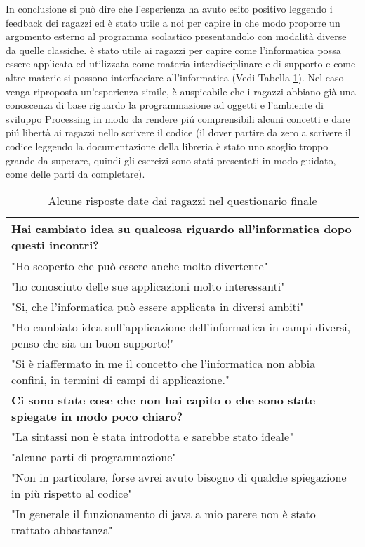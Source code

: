 In conclusione si può dire che l'esperienza ha avuto esito positivo leggendo i feedback dei ragazzi ed è stato utile a noi per capire in che modo proporre un argomento esterno al programma scolastico presentandolo con modalità diverse da quelle classiche. è stato utile ai ragazzi per capire come l'informatica possa essere applicata ed utilizzata come materia interdisciplinare e di supporto e come altre materie si possono interfacciare all'informatica (Vedi Tabella \ref{table:risposte_finali}). Nel caso venga riproposta un'esperienza simile, è auspicabile che i ragazzi abbiano già una conoscenza di base riguardo la programmazione ad oggetti e l'ambiente di sviluppo Processing in modo da rendere piú comprensibili alcuni concetti e dare piú libertà ai ragazzi nello scrivere il codice (il dover partire da zero a scrivere il codice leggendo la documentazione della libreria è stato uno scoglio troppo grande da superare, quindi gli esercizi sono stati presentati in modo guidato, come delle parti da completare).



\begin{center}
\def\arraystretch{1.3}
\begin{table}[!ht]

    \caption{Alcune risposte date dai ragazzi nel questionario finale}

    \begin{tabular}{p{}}
        
        \bfseries{Hai cambiato idea su qualcosa riguardo all'informatica dopo questi incontri?} \\
        \midrule
        "Ho scoperto che può essere anche molto divertente"  \\
        "ho conosciuto delle sue applicazioni molto interessanti" \\
        "Si, che l'informatica può essere applicata in diversi ambiti" \\
        "Ho cambiato idea sull'applicazione dell'informatica in campi diversi, penso che sia un buon supporto!" \\
        "Si è riaffermato in me il concetto che l'informatica non abbia confini, in termini di campi di applicazione." \\
        \midrule
        \bfseries{Ci sono state cose che non hai capito o che sono state spiegate in modo poco chiaro?} \\
        \midrule
        "La sintassi non è stata introdotta e sarebbe stato ideale" \\
        "alcune parti di programmazione" \\
        "Non in particolare, forse avrei avuto bisogno di qualche spiegazione in più rispetto al codice" \\
        "In generale il funzionamento di java a mio parere non è stato trattato abbastanza" \\
    \end{tabular}
    \label{table:risposte_finali}
\end{table}


\end{center}

